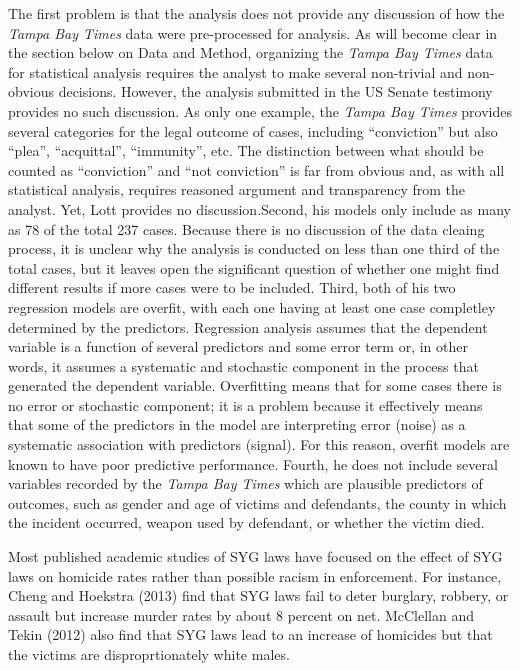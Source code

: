 \documentclass[12pt,article]{article}
\begin{document}
The first problem is that the analysis does not provide any discussion
of how the \emph{Tampa Bay Times} data were pre-processed for analysis.
As will become clear in the section below on Data and Method, organizing
the \emph{Tampa Bay Times} data for statistical analysis requires the
analyst to make several non-trivial and non-obvious decisions. However,
the analysis submitted in the US Senate testimony provides no such
discussion. As only one example, the \emph{Tampa Bay Times} provides
several categories for the legal outcome of cases, including
``conviction'' but also ``plea'', ``acquittal'', ``immunity'', etc. The
distinction between what should be counted as ``conviction'' and ``not
conviction'' is far from obvious and, as with all statistical analysis,
requires reasoned argument and transparency from the analyst. Yet, Lott
provides no discussion.Second, his models only include as many as 78 of
the total 237 cases. Because there is no discussion of the data cleaing
process, it is unclear why the analysis is conducted on less than one
third of the total cases, but it leaves open the significant question of
whether one might find different results if more cases were to be
included. Third, both of his two regression models are overfit, with
each one having at least one case completley determined by the
predictors. Regression analysis assumes that the dependent variable is a
function of several predictors and some error term or, in other words,
it assumes a systematic and stochastic component in the process that
generated the dependent variable. Overfitting means that for some cases
there is no error or stochastic component; it is a problem because it
effectively means that some of the predictors in the model are
interpreting error (noise) as a systematic association with predictors
(signal). For this reason, overfit models are known to have poor
predictive performance. Fourth, he does not include several variables
recorded by the \emph{Tampa Bay Times} which are plausible predictors of
outcomes, such as gender and age of victims and defendants, the county
in which the incident occurred, weapon used by defendant, or whether the
victim died.

Most published academic studies of SYG laws have focused on the effect
of SYG laws on homicide rates rather than possible racism in
enforcement. For instance, Cheng and Hoekstra (2013) find that SYG laws
fail to deter burglary, robbery, or assault but increase murder rates by
about 8 percent on net. McClellan and Tekin (2012) also find that SYG
laws lead to an increase of homicides but that the victims are
disproprtionately white males.
\end{document}
